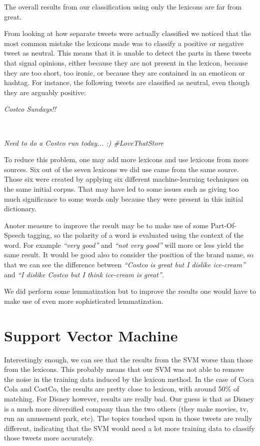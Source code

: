 \documentclass[a4paper,12pt]{report}
\begin{document}
The overall results from our classification using only the lexicons are far from great. 

From looking at how separate tweets were actually classified we noticed that the most common mistake the lexicons made was to classify a positive or negative tweet as neutral. 
This means that it is unable to detect the parts in these tweets that signal opinions, either because they are not present in the lexicon, because they are too short, too ironic, or because they are contained in an emoticon or hashtag.
For instance, the following tweets are classified as neutral, even though they are arguably positive:
\\
\centerline{\textit{Costco Sundays!!}}\\
\centerline{\textit{Need to do a Costco run today... :) \#LoveThatStore}}

To reduce this problem, one may add more lexicons and use lexicons from more sources. Six out of the seven lexicons we did use came from the same source. Those six were created by applying six different machine-learning techniques on the same initial corpus. That may have led to some issues such as giving too much significance to some words only because they were present in this initial dictionary.

Anoter measure to improve the result may be to make use of some Part-Of-Speech tagging, so the polarity of a word is evaluated using the context of the word. For example \emph{``very good''} and \emph{``not very good''} will more or less yield the same result. It would be good also to consider the position of the brand name, so that we can see the difference between \emph{``Costco is great but I dislike ice-cream''} and \emph{``I dislike Costco but I think ice-cream is great''}.

We did perform some lemmatization but to improve the results one would have to make use of even more sophisticated lemmatization.

\section{Support Vector Machine}

Interestingly enough, we can see that the results from the SVM worse than those from the lexicons.
This probably means that our SVM was not able to remove the noise in the training data induced by the lexicon method.
In the case of Coca Cola and CostCo, the results are pretty close to lexicon, with around 50\% of matching.
For Disney however, results are really bad. 
Our guess is that as Disney is a much more diversified company than the two others (they make movies, tv, run an amusement park, etc). The topics touched upon in those tweets are really different, indicating that the SVM would need a lot more training data to classify those tweets more accurately.
\end{document}
